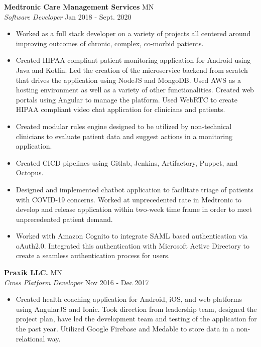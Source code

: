 \documentclass[a4paper]{article}
\begin{document}
\textbf{Medtronic Care Management Services} \hfill MN\\
\textit{Software Developer} \hfill Jan 2018 - Sept. 2020\\
\vspace{-1mm}
\begin{itemize} \itemsep 1pt
	\item Worked as a full stack developer on a variety of projects all centered around improving outcomes of chronic, complex, co-morbid patients.
	\item Created HIPAA compliant patient monitoring application for Android using Java and Kotlin. Led the creation of the microservice backend from scratch that drives the application using NodeJS and MongoDB. Used AWS as a hosting environment as well as a variety of other functionalities. Created web portals using Angular to manage the platform. Used WebRTC to create HIPAA compliant video chat application for clinicians and patients.
	\item Created modular rules engine designed to be utilized by non-technical clinicians to evaluate patient data and suggest actions in a monitoring application.
	\item Created CICD pipelines using Gitlab, Jenkins, Artifactory, Puppet, and Octopus.
	\item Designed and implemented chatbot application to facilitate triage of patients with COVID-19 concerns. Worked at unprecedented rate in Medtronic to develop and release application within two-week time frame in order to meet unprecedented patient demand.
	\item Worked with Amazon Cognito to integrate SAML based authentication via oAuth2.0. Integrated this authentication with Microsoft Active Directory to create a seamless authentication process for users.
\end{itemize}
\textbf{Praxik LLC.} \hfill MN\\
\textit{Cross Platform Developer} \hfill Nov 2016 - Dec 2017\\
\vspace{-1mm}
\begin{itemize} \itemsep 1pt
	\item Created health coaching application for Android, iOS, and web platforms using AngularJS and Ionic. Took direction from leadership team, designed the project plan, have led the development team and testing of the application for the past year. Utilized Google Firebase and Medable to store data in a non-relational way.
\end{itemize}
\end{document}
